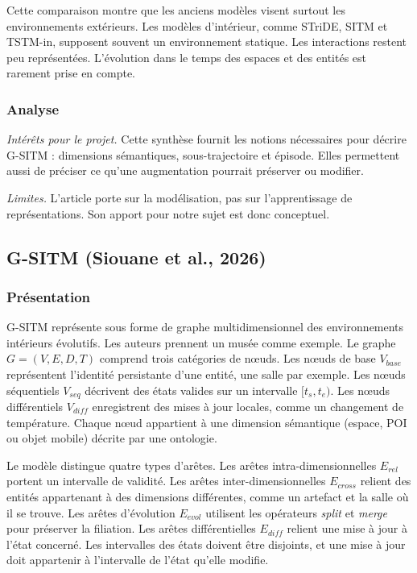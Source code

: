 \documentclass[11pt, french, screen, research-development]{report-rd-info}
\begin{document}
 Cette comparaison montre que les anciens modèles visent surtout les environnements extérieurs. Les
modèles d'intérieur, comme STriDE, SITM et TSTM-in, supposent souvent un environnement statique. Les
interactions restent peu représentées. L'évolution dans le temps des espaces et des entités est
rarement prise en compte.

\subsubsection*{Analyse}

\emph{Intérêts pour le projet.}
 Cette synthèse fournit les notions nécessaires pour décrire G-SITM : dimensions sémantiques,
sous-trajectoire et épisode. Elles permettent aussi de préciser ce qu'une augmentation pourrait
préserver ou modifier.

\emph{Limites.}
 L'article porte sur la modélisation, pas sur l'apprentissage de représentations. Son apport pour
notre sujet est donc conceptuel.

\subsection{G-SITM (Siouane et al., 2026)}

\subsubsection*{Présentation}

 G-SITM \cite{siouane2026gsitm} représente sous forme de graphe multidimensionnel des environnements
intérieurs évolutifs. Les auteurs prennent un musée comme exemple. Le graphe $G=(V,E,D,T)$ comprend
trois catégories de nœuds. Les nœuds de base $V_{base}$ représentent l'identité persistante d'une
entité, une salle par exemple. Les nœuds séquentiels $V_{seq}$ décrivent des états valides sur un
intervalle $[t_s,t_e)$. Les nœuds différentiels $V_{diff}$ enregistrent des mises à jour locales,
comme un changement de température. Chaque nœud appartient à une dimension sémantique (espace, POI
ou objet mobile) décrite par une ontologie.

 Le modèle distingue quatre types d'arêtes. Les arêtes intra-dimensionnelles $E_{rel}$ portent un
intervalle de validité. Les arêtes inter-dimensionnelles $E_{cross}$ relient des entités appartenant
à des dimensions différentes, comme un artefact et la salle où il se trouve. Les arêtes d'évolution
$E_{evol}$ utilisent les opérateurs \emph{split} et \emph{merge} pour préserver la filiation. Les
arêtes différentielles $E_{diff}$ relient une mise à jour à l'état concerné. Les intervalles des
états doivent être disjoints, et une mise à jour doit appartenir à l'intervalle de l'état qu'elle
modifie.
\end{document}
